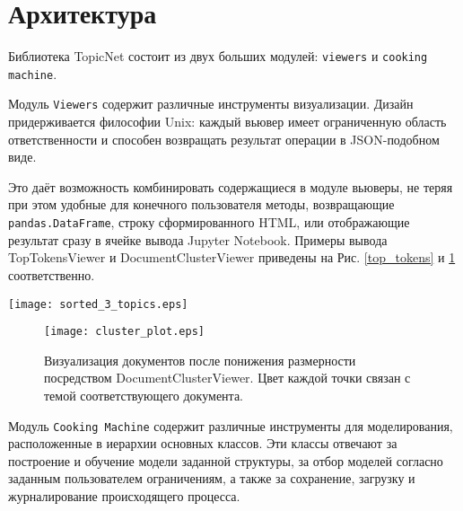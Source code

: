 \section{Архитектура} 

Библиотека TopicNet состоит из двух больших модулей: \texttt{viewers} и \texttt{cooking machine}.  

Модуль \texttt{Viewers} содержит различные инструменты визуализации. Дизайн придерживается философии Unix: каждый вьювер имеет ограниченную область ответственности и способен возвращать результат операции в JSON-подобном виде.

Это даёт возможность комбинировать содержащиеся в модуле вьюверы, не теряя при этом удобные для конечного пользователя методы, возвращающие \texttt{pandas.DataFrame}, строку сформированного HTML, или отображающие результат сразу в ячейке вывода Jupyter Notebook. Примеры вывода TopTokensViewer и DocumentClusterViewer приведены на Рис. \ref{top_tokens} и \ref{documents_clusters} соответственно.  

\begin{figure*}[h]
    \centering
    \texttt{[image: sorted\_3\_topics.eps]}
    \caption{Вывод TopTokensViewer. Для каждого токена вычисляется заданная функция, используемая для сортировки и выбора токенов для показа. Функция здаётся при инициализации вьювера.}
\label{top_tokens}
\end{figure*} 

\begin{figure}[h]
    \centering
    \texttt{[image: cluster\_plot.eps]}
    \caption{Визуализация документов после понижения размерности посредством DocumentClusterViewer. Цвет каждой точки связан с темой соответствующего документа.}
\label{documents_clusters}

\end{figure} 



Модуль \texttt{Cooking Machine} содержит различные инструменты для моделирования, расположенные в иерархии основных классов. Эти классы отвечают за построение и обучение модели заданной структуры, за отбор моделей согласно заданным пользователем ограничениям, а также за сохранение, загрузку и журналирование происходящего процесса.

